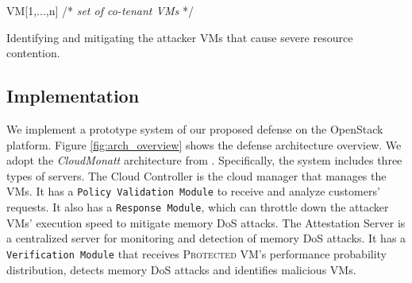 \documentclass{sig-alternate}
\newcommand{\attackname}{memory DoS attacks\xspace}
\newcommand{\protectedVM}{\textsc{Protected VM}\xspace}
\begin{document}
\begin{algorithm}[ht]
\scriptsize
\SetAlgoLined

\SetAlgoLined\DontPrintSemicolon
\KwIn{}
 \Indp VM[1,...,n]  /* \emph{set of co-tenant VMs} */\\
  \BlankLine
  \BlankLine
\Indm
{}

  \BlankLine
  \BlankLine


\caption{Identifying and mitigating the attacker VMs that cause severe resource contention.}
 \label{alg:detect_attacker}
\end{algorithm}

\subsection{Implementation}
\label{sec:implementation}

We implement a prototype system of our proposed defense on the OpenStack platform. 
Figure \ref{fig:arch_overview} shows the defense architecture overview.
We adopt the \emph{CloudMonatt} architecture from \cite{ZhLe:15}. 
Specifically, the system includes three types of servers. The Cloud Controller is the cloud manager that manages the VMs. It has a \texttt{Policy Validation Module} to receive and analyze customers' requests. It also has a \texttt{Response Module}, which can throttle down the attacker VMs' execution speed to mitigate \attackname. The Attestation Server is a centralized server for monitoring and detection of \attackname. It has a \texttt{Verification Module} that receives \protectedVM's performance probability distribution, detects \attackname and identifies malicious VMs. 
\end{document}
